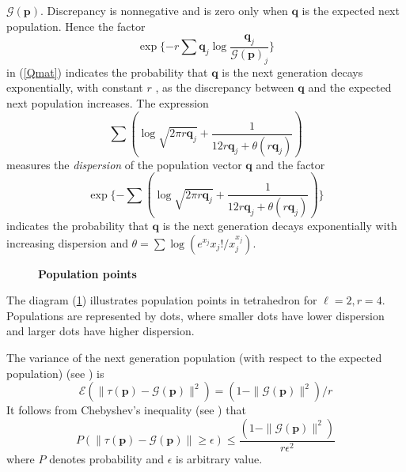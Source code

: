 $\mathcal{G}(\bm{p})$. Discrepancy is nonnegative and is zero only when $\bm{q}$ is the expected next population. Hence the factor 
\[
\exp\{-r \sum \bm{q}_j \log \frac{\bm{q}_j}{\mathcal{G}(\bm{p})_j}\}
\]
in (\ref{Qmat}) indicates the probability that $\bm{q}$ is the next generation
decays exponentially, with constant $r$ , as the discrepancy between $\bm{q}$ and the
expected next population increases.
The expression 
\[
\sum (\log \sqrt{2 \pi r\bm{q}_j} + \frac{1}{12r\bm{q}_j + \theta (r\bm{q}_j)})
\]
measures the {\em dispersion} of the population vector $\bm{q}$ and the factor
\[
\exp\{- \sum (\log \sqrt{2 \pi r\bm{q}_j} + \frac{1}{12r\bm{q}_j + \theta (r\bm{q}_j)})\}
\]
indicates the probability that $\bm{q}$ is the next generation decays exponentially with increasing dispersion and 
$\theta  =  \sum \log(e^{x_j}x_j!/x_j^{x_j})$.

\begin{figure}[H]
\begin{center}
\hspace{4pt}
\caption{\textbf{Population points} }
\label{tetra_popn}
\end{center}
\end{figure}

The diagram (\ref{tetra_popn}) illustrates population points in tetrahedron for $\ell  =  2,  r  =  4$. Populations are represented by dots, 
where smaller dots have lower dispersion and larger dots have higher dispersion.

The variance of the next generation population (with respect to the expected population) (see \cite{Vose1999}) is 
\begin{equation}
\label{RHSvariance}
\mathcal{E}(\| \tau (\bm{p}) - \mathcal{G}(\bm{p}) \|^2) = (1 - \|\mathcal{G}(\bm{p})\|^2) / r
\end{equation}
It follows from Chebyshev's inequality (see \cite{ChebyshevInequality}) that 
\begin{equation}
\label{Cheby}
P(\| \tau (\bm{p}) - \mathcal{G}(\bm{p}) \| \geq \epsilon) \leq \frac{(1 - \|\mathcal{G}(\bm{p})\|^2)} {r{\epsilon}^2}
\end{equation}
where $P$ denotes probability and $\epsilon$ is arbitrary value.

